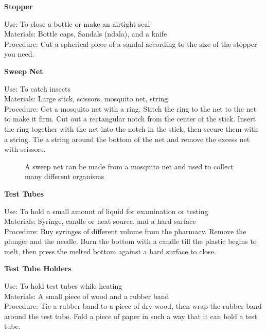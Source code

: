 \begin{flushleft}
\textbf{Stopper}
\end{flushleft}
\vspace{-10pt}
Use: To close a bottle or make an airtight seal\\
Materials: Bottle caps, Sandals (ndala), and a knife\\
Procedure: Cut a spherical piece of a sandal according to the size of the stopper you need.\\

\begin{flushleft}
\textbf{Sweep Net}
\end{flushleft}
\vspace{-10pt}
Use: To catch insects\\
Materials: Large stick, scissors, mosquito net, string\\
Procedure: Get a mosquito net with a ring. Stitch the ring to the net to the net to make it firm. Cut out a rectangular notch from the center of the stick. Insert the ring together with the net into the notch in the stick, then secure them with a string. Tie a string around the bottom of the net and remove the excess net with scissors.\\

\begin{figure}[h]
\begin{center}
\def\svgwidth{9cm}

\caption{A sweep net can be made from a mosquito net and used to collect many different organisms}
\label{fig:butterfly-net}
\end{center}
\end{figure}


\begin{flushleft}
\textbf{Test Tubes}
\end{flushleft}
\vspace{-10pt}
Use: To hold a small amount of liquid for examination or testing\\
Materials: Syringe, candle or heat source, and a hard surface\\
Procedure: Buy syringes of different volume from the pharmacy. Remove the plunger and the needle. Burn the bottom with a candle till the plastic begins to melt, then press the melted bottom against a hard surface to close.\\

\begin{flushleft}
\textbf{Test Tube Holders}
\end{flushleft}
\vspace{-10pt}
Use: To hold test tubes while heating\\
Materials: A small piece of wood and a rubber band\\
Procedure: Tie a rubber band to a piece of dry wood, then wrap the rubber band around the test tube. Fold a piece of paper in such a way that it can hold a test tube.\\


